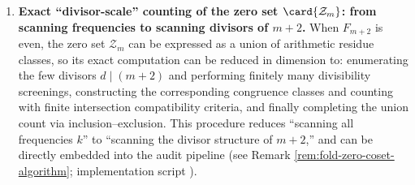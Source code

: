 \begin{enumerate}
  \item \textbf{Exact ``divisor-scale'' counting of the zero set \texorpdfstring{$\card{\mathcal{Z}_m}$}{|Z_m|}: from scanning frequencies to scanning divisors of \texorpdfstring{$m+2$}{m+2}.}
  When \(F_{m+2}\) is even, the zero set \(\mathcal{Z}_m\) can be expressed as a union of arithmetic residue classes, so its exact computation can be reduced in dimension to:
  enumerating the few divisors \(d\mid(m+2)\) and performing finitely many divisibility screenings, constructing the corresponding congruence classes and counting with finite intersection compatibility criteria, and finally completing the union count via inclusion--exclusion.
  This procedure reduces ``scanning all frequencies \(k\)'' to ``scanning the divisor structure of \(m+2\),'' and can be directly embedded into the audit pipeline (see Remark \ref{rem:fold-zero-coset-algorithm}; implementation script \texttt{}).
\end{enumerate}

